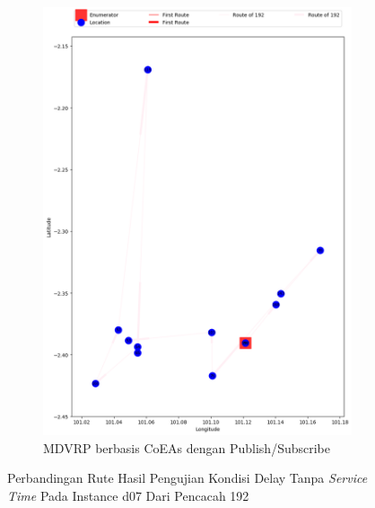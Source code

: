 \begin{figure}[H]\ContinuedFloat
	\centering
	\begin{subfigure}[t]{\textwidth}
		\centering
		\includegraphics[width=\textwidth]{Resources/Images/delayed_7/real_m15_n100_delayed_7_192_pubsub_coes}
		\caption{MDVRP berbasis CoEAs dengan Publish/Subscribe}
		\label{fig:real_m15_n100_delayed_7_192_pubsub_coes}
	\end{subfigure}
	\caption{Perbandingan Rute Hasil Pengujian Kondisi Delay Tanpa \textit{Service Time} Pada Instance d07 Dari Pencacah 192}
	\label{fig:real_m15_n100_delayed_7_192_contd}
\end{figure}


